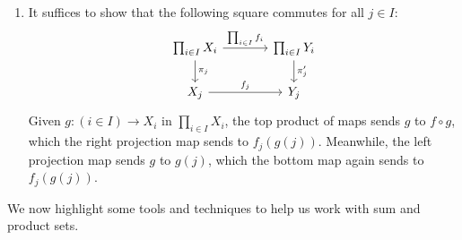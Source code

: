 \documentclass[Book-Poly]{subfiles}
\begin{document}
\begin{exercise}
\begin{solution}
\begin{enumerate}
            \item It suffices to show that the following square commutes for all $j\in I$:
            \[
            \begin{tikzcd}[column sep=large]
                \prod_{i\in I}X_i \ar[d, "\pi_j"] \ar[r, "\prod_{i\in I}f_i"] & \prod_{i\in I}Y_i \ar[d, "\pi'_j"] \\
                X_j \ar[r, "f_j"] & Y_j
            \end{tikzcd}
            \]
            Given $g\colon(i\in I)\to X_i$ in $\prod_{i\in I}X_i$, the top product of maps sends $g$ to $f\circ g$, which the right projection map sends to $f_j(g(j))$.
            Meanwhile, the left projection map sends $g$ to $g(j)$, which the bottom map again sends to $f_j(g(j))$.
        \end{enumerate}
    \end{solution}
\end{exercise}

We now highlight some tools and techniques to help us work with sum and product sets.
\end{document}
